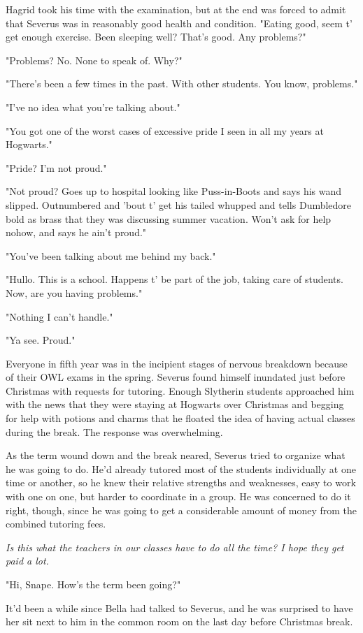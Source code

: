 \documentclass[a4paper,11pt]{article}
\begin{document}
Hagrid took his time with the examination, but at the end was forced to admit that Severus was in reasonably good health and condition. "Eating good, seem t' get enough exercise. Been sleeping well? That's good. Any problems?"

"Problems? No. None to speak of. Why?"

"There's been a few times in the past. With other students. You know, problems."

"I've no idea what you're talking about."

"You got one of the worst cases of excessive pride I seen in all my years at Hogwarts."

"Pride? I'm not proud."

"Not proud? Goes up to hospital looking like Puss-in-Boots and says his wand slipped. Outnumbered and 'bout t' get his tailed whupped and tells Dumbledore bold as brass that they was discussing summer vacation. Won't ask for help nohow, and says he ain't proud."

"You've been talking about me behind my back."

"Hullo. This is a school. Happens t' be part of the job, taking care of students. Now, are you having problems."

"Nothing I can't handle."

"Ya see. Proud."

Everyone in fifth year was in the incipient stages of nervous breakdown because of their OWL exams in the spring. Severus found himself inundated just before Christmas with requests for tutoring. Enough Slytherin students approached him with the news that they were staying at Hogwarts over Christmas and begging for help with potions and charms that he floated the idea of having actual classes during the break. The response was overwhelming.

As the term wound down and the break neared, Severus tried to organize what he was going to do. He'd already tutored most of the students individually at one time or another, so he knew their relative strengths and weaknesses, easy to work with one on one, but harder to coordinate in a group. He was concerned to do it right, though, since he was going to get a considerable amount of money from the combined tutoring fees.

\emph{Is this what the teachers in our classes have to do all the time? I hope they get paid a lot.}

"Hi, Snape. How's the term been going?"

It'd been a while since Bella had talked to Severus, and he was surprised to have her sit next to him in the common room on the last day before Christmas break.
\end{document}

